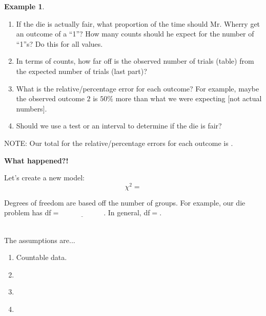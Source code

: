 \documentclass[12pt]{amsart}
\theoremstyle{definition}
\newtheorem{ex}{Example}
\begin{document}
\begin{ex} 
\begin{enumerate}
\item If the die is actually fair, what proportion of the time should Mr. Wherry get an outcome of a ``1''? How many counts should he expect for the number of ``1''s? Do this for all values.

\vspace{0.5in}

\item In terms of counts, how far off is the observed number of trials (table) from the expected number of trials (last part)?

\vspace{0.5in}

\item What is the relative/percentage error for each outcome? For example, maybe the observed outcome $2$ is $50\%$ more than what we were expecting [not actual numbers].

\vfill

\item Should we use a test or an interval to determine if the die is fair?
\vspace{0.5in}
\end{enumerate}
\end{ex}

NOTE: Our total for the relative/percentage errors for each outcome is \underline{\hspace{0.25in}}.

\newpage
\textbf{What happened?!}

\vspace{0.25in}


\noindent Let's create a new model: $$\chi^2=$$

\vspace{0.5in}

\noindent Degrees of freedom are based off the number of groups. For example, our die problem has df$=\underline{\hspace{1in}}$. In general, df$=$.\\
~\\
\begin{framed}
 \noindent The assumptions are...
\begin{enumerate}
 \item Countable data.
 \item \,
 \item \,
 \item \,
\end{enumerate}
\end{framed}
\vspace{0.2in}
\end{document}
